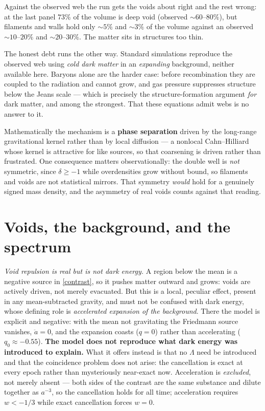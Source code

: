 \documentclass[11pt]{article}
\begin{document}
Against the observed web the run gets the voids about right and the rest wrong: at the last panel $73\%$ of the
volume is deep void (observed ${\sim}60$--$80\%$), but filaments and walls hold only ${\sim}5\%$ and ${\sim}3\%$ of
the volume against an observed ${\sim}10$--$20\%$ and ${\sim}20$--$30\%$. The matter sits in structures too thin.

The honest debt runs the other way. Standard simulations reproduce the observed web using \emph{cold dark matter}
in an \emph{expanding} background, neither available here. Baryons alone are the harder case: before recombination
they are coupled to the radiation and cannot grow, and gas pressure suppresses structure below the Jeans scale ---
which is precisely the structure-formation argument \emph{for} dark matter, and among the strongest. That these
equations admit webs is no answer to it.

Mathematically the mechanism is a \textbf{phase separation} driven by the long-range gravitational kernel rather
than by local diffusion --- a nonlocal Cahn--Hilliard~\cite{cahnhilliard,ohtakawasaki} whose kernel is attractive
for like sources, so that coarsening is driven rather than frustrated. One consequence matters observationally:
the double well is \emph{not} symmetric, since $\delta\ge-1$ while overdensities grow without bound, so filaments
and voids are not statistical mirrors. That symmetry \emph{would} hold for a genuinely signed mass density, and
the asymmetry of real voids counts against that reading.

\section{Voids, the background, and the spectrum}\label{sec:de-infl}
\emph{Void repulsion is real but is not dark energy.} A region below the mean is a negative source in
\eqref{contrast}, so it pushes matter outward and grows: voids are actively driven, not merely evacuated. But this
is a local, peculiar effect, present in any mean-subtracted gravity, and must not be confused with dark energy,
whose defining role is \emph{accelerated expansion of the background}. There the model is explicit and negative:
with the mean not gravitating the Friedmann source vanishes, $\ddot a=0$, and the expansion coasts ($q=0$) rather
than accelerating ($q_0\approx-0.55$). \textbf{The model does not reproduce what dark energy was introduced to
explain.} What it offers instead is that no $\Lambda$ need be introduced and that the coincidence problem does not
arise: the cancellation is exact at every epoch rather than mysteriously near-exact now. Acceleration is
\emph{excluded}, not merely absent --- both sides of the contrast are the same substance and dilute together as
$a^{-3}$, so the cancellation holds for all time; acceleration requires $w<-1/3$ while exact cancellation forces
$w=0$.
\end{document}
